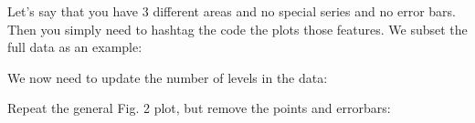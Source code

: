 \documentclass[]{article}
\newenvironment{Shaded}{\begin{snugshade}}{\end{snugshade}}
\newcommand{\KeywordTok}[1]{\textcolor[rgb]{0.13,0.29,0.53}{\textbf{#1}}}
\newcommand{\StringTok}[1]{\textcolor[rgb]{0.31,0.60,0.02}{#1}}
\newcommand{\OperatorTok}[1]{\textcolor[rgb]{0.81,0.36,0.00}{\textbf{#1}}}
\newcommand{\NormalTok}[1]{#1}
\begin{document}
Let's say that you have 3 different areas and no special series and no
error bars. Then you simply need to hashtag the code the plots those
features. We subset the full data as an example:

\begin{Shaded}
\end{Shaded}

We now need to update the number of levels in the data:

\begin{Shaded}
\end{Shaded}

Repeat the general Fig. 2 plot, but remove the points and errorbars:
\end{document}
